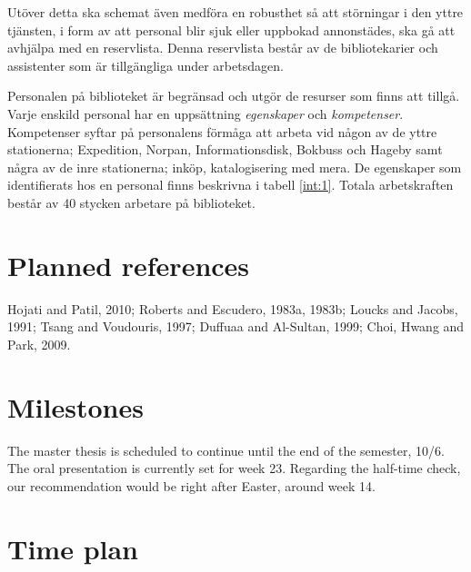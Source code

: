 \documentclass{article}
\begin{document}
Utöver detta ska schemat även medföra en robusthet så att störningar i den yttre tjänsten, i form av att personal blir sjuk eller uppbokad annonstädes, ska gå att avhjälpa med en reservlista. Denna reservlista består av de bibliotekarier och assistenter som är tillgängliga under arbetsdagen. 

Personalen på biblioteket är begränsad och utgör de resurser som finns att tillgå. Varje enskild personal har en uppsättning \textit{egenskaper} och \textit{kompetenser}. Kompetenser syftar på personalens förmåga att arbeta vid någon av de yttre stationerna; Expedition, Norpan, Informationsdisk, Bokbuss och Hageby samt några av de inre stationerna; inköp, katalogisering med mera. De egenskaper som identifierats hos en personal finns beskrivna i tabell \ref{int:1}. Totala arbetskraften består av 40 stycken arbetare på biblioteket.
\fi
\pagebreak
\section*{Planned references}
Hojati and Patil, 2010; Roberts and Escudero, 1983a, 1983b; Loucks and Jacobs, 1991; Tsang and Voudouris, 1997; Duffuaa and Al-Sultan, 1999; Choi, Hwang and Park, 2009.

\section*{Milestones}
The master thesis is scheduled to continue until the end of the semester, 10/6. The oral presentation is currently set for week 23. Regarding the half-time check, our recommendation would be right after Easter, around week 14.

\section*{Time plan}
\end{document}
